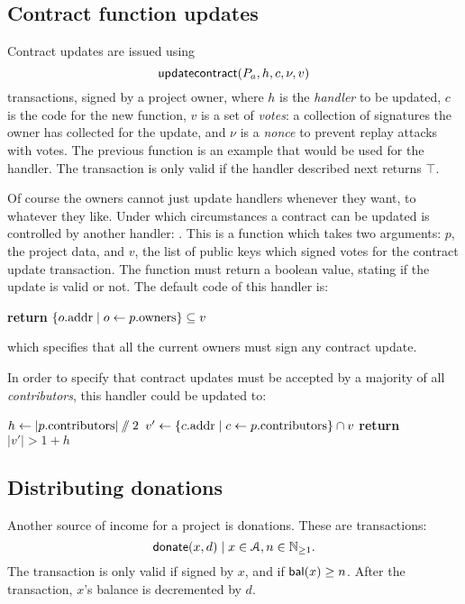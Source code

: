 \subsection{Contract function updates}

Contract updates are issued using
\[
    \mathsf{updatecontract}\lparen P_a, h, c, \nu, v\rparen
\]
transactions, signed by a project owner, where $h$ is the \emph{handler} to be
updated, $c$ is the code for the new function, $v$ is a set of \emph{votes}: a
collection of signatures the owner has collected for the update, and $\nu$ is a
\emph{nonce} to prevent replay attacks with votes. The previous function is an
example that would be used for the  handler. The
transaction is only valid if the  handler
described next returns $\top$.

Of course the owners cannot just update handlers whenever they want, to
whatever they like. Under which circumstances a contract can be updated is
controlled by another handler: . This is a
function which takes two arguments: $p$, the project data, and $v$, the list of
public keys which signed votes for the contract update transaction. The
function must return a boolean value, stating if the update is valid or not.
The default code of this handler is:
\begin{algorithmic}[0]
        \State \textbf{return} $\{ o.{\mathrm{addr}} \mid o \gets p.{\mathrm{owners}} \} \subseteq v$
    \EndProcedure
\end{algorithmic}
which specifies that all the current owners must sign any contract update.

In order to specify that contract updates must be accepted by a majority of all
\emph{contributors}, this handler could be updated to:
\medskip
\begin{algorithmic}[0]
        \State $h \gets |p.{\mathrm{contributors}}| \sslash 2$
        \State $v' \gets \{ c.{\mathrm{addr}} \mid c \gets p.{\mathrm{contributors}} \} \cap v$
        \State \textbf{return} $|v'| > 1 + h$
    \EndProcedure
\end{algorithmic}

\subsection{Distributing donations}

Another source of income for a project is donations. These are transactions:
\[
    \mathsf{donate}\lparen x, d\rparen \mid x \in \mathcal{A}, n \in \mathbb{N}_{\geq 1}.
\]
The transaction is only valid if signed by $x$, and if $\mathsf{bal}(x) \geq n$. After
the transaction, $x$'s balance is decremented by $d$.


